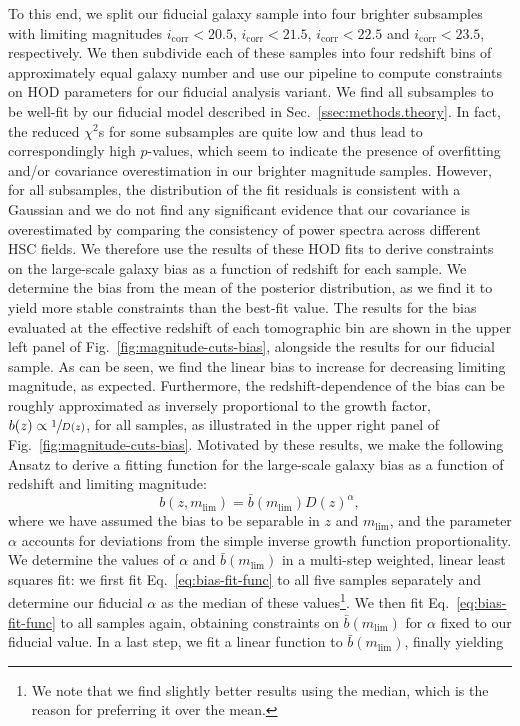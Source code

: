 \documentclass[a4paper,11pt]{article}
\begin{document}
    To this end, we split our fiducial galaxy sample into four brighter subsamples with limiting magnitudes $i_{\mathrm{corr}} < 20.5$, $i_{\mathrm{corr}} < 21.5$, $i_{\mathrm{corr}} < 22.5$ and $i_{\mathrm{corr}} < 23.5$, respectively. We then subdivide each of these samples into four redshift bins of approximately equal galaxy number and use our pipeline to compute constraints on HOD parameters for our fiducial analysis variant. We find all subsamples to be well-fit by our fiducial model described in Sec.~\ref{ssec:methods.theory}. In fact, the reduced $\chi^{2}$s for some subsamples are quite low and thus lead to correspondingly high $p$-values, which seem to indicate the presence of overfitting and/or covariance overestimation in our brighter magnitude samples. However, for all subsamples, the distribution of the fit residuals is consistent with a Gaussian and we do not find any significant evidence that our covariance is overestimated by comparing the consistency of power spectra across different HSC fields. We therefore use the results of these HOD fits to derive constraints on the large-scale galaxy bias as a function of redshift for each sample. We determine the bias from the mean of the posterior distribution, as we find it to yield more stable constraints than the best-fit value. The results for the bias evaluated at the effective redshift of each tomographic bin are shown in the upper left panel of Fig.~\ref{fig:magnitude-cuts-bias}, alongside the results for our fiducial sample. As can be seen, we find the linear bias to increase for decreasing limiting magnitude, as expected. Furthermore, the redshift-dependence of the bias can be roughly approximated as inversely proportional to the growth factor, $b(z) \propto \sfrac{1}{D(z)}$, for all samples, as illustrated in the upper right panel of Fig.~\ref{fig:magnitude-cuts-bias}. Motivated by these results, we make the following Ansatz to derive a fitting function for the large-scale galaxy bias as a function of redshift and limiting magnitude:
    \begin{equation}
      b(z, m_{\mathrm{lim}}) = \bar{b}(m_{\mathrm{lim}}) D(z)^{\alpha},
      \label{eq:bias-fit-func}
    \end{equation}
    where we have assumed the bias to be separable in $z$ and $m_{\mathrm{lim}}$, and the parameter $\alpha$ accounts for deviations from the simple inverse growth function proportionality. We determine the values of $\alpha$ and $\bar{b}(m_{\mathrm{lim}})$ in a multi-step weighted, linear least squares fit: we first fit Eq.~\ref{eq:bias-fit-func} to all five samples separately and determine our fiducial $\alpha$ as the median of these values\footnote{We note that we find slightly better results using the median, which is the reason for preferring it over the mean.}. We then fit Eq.~\ref{eq:bias-fit-func} to all samples again, obtaining constraints on $\bar{b}(m_{\mathrm{lim}})$ for $\alpha$ fixed to our fiducial value. In a last step, we fit a linear function to $\bar{b}(m_{\mathrm{lim}})$, finally yielding
\end{document}
